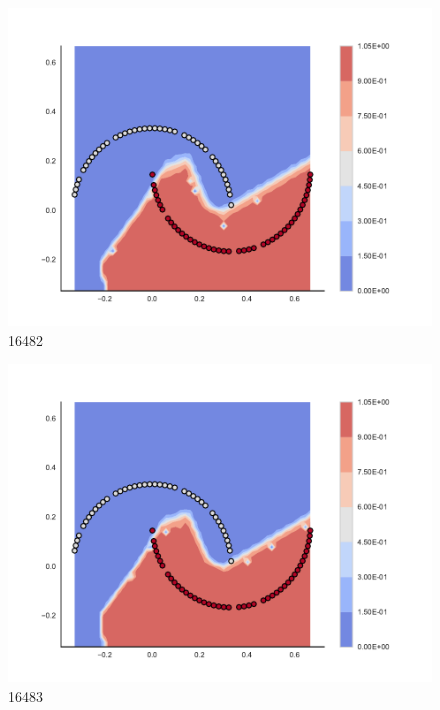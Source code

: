 \begin{subfigure}[b]{0.09\textwidth}
    \includegraphics[clip, trim=2.35cm 1.75cm 4.5cm 0cm,width=\textwidth]{img/convergence/16482.pdf}
    \caption{16482}
    \label{fig:convergence_16482}
\end{subfigure}
%
\begin{subfigure}[b]{0.09\textwidth}
    \includegraphics[clip, trim=2.35cm 1.75cm 4.5cm 0cm,width=\textwidth]{img/convergence/16483.pdf}
    \caption{16483}
    \label{fig:convergence_16483}
\end{subfigure}
%

